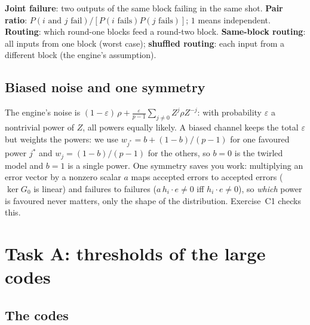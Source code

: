 \documentclass[11pt]{article}
\newcommand{\eps}{\varepsilon}
\begin{document}
\begin{vocab}
\textbf{Joint failure}: two outputs of the same block failing in the same shot.
\textbf{Pair ratio}: $P(i\text{ and }j\text{ fail})/[P(i\text{ fails})P(j\text{ fails})]$;
$1$ means independent. \textbf{Routing}: which round-one blocks feed a round-two
block. \textbf{Same-block routing}: all inputs from one block (worst case);
\textbf{shuffled routing}: each input from a different block (the engine's
assumption).
\end{vocab}

\subsection{Biased noise and one symmetry}

The engine's noise is $(1-\eps)\,\rho + \frac{\eps}{p-1}\sum_{j\ne0} Z^j\rho Z^{-j}$:
with probability $\eps$ a nontrivial power of $Z$, all powers equally likely. A biased
channel keeps the total $\eps$ but weights the powers: we use
$w_{j^*} = b + (1-b)/(p-1)$ for one favoured power $j^*$ and $w_j=(1-b)/(p-1)$ for
the others, so $b=0$ is the twirled model and $b=1$ is a single power. One symmetry
saves you work: multiplying an error vector by a nonzero scalar $a$ maps accepted
errors to accepted errors ($\ker G_0$ is linear) and failures to failures
($a\,h_i\cdot e\ne0$ iff $h_i\cdot e\ne0$), so \emph{which} power is favoured never
matters, only the shape of the distribution. Exercise~C1 checks this.

\section{Task A: thresholds of the large codes}
\label{sec:A}

\subsection{The codes}
\end{document}
